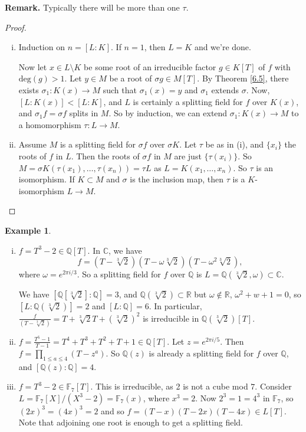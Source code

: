 \documentclass{article}
\theoremstyle{definition}
\newtheorem{example}{Example}[section]
\begin{document}
\textbf{Remark.} Typically there will be more than one $\tau$.

\begin{proof}
    \begin{enumerate}[(i)]
        \item Induction on $n = [L:K]$. If $n=1$, then $L=K$ and we're done.

        Now let $x \in L \setminus K$ be some root of an irreducible factor $g \in K[T]$ of $f$ with $\text{deg}(g)>1$. Let $y \in M$ be a root of $\sigma g \in M[T]$. By Theorem \ref{6.5}, there exists $\sigma_1 : K(x) \to M$ such that $\sigma_1(x) = y$ and $\sigma_1$ extends $\sigma.$ Now, $[L : K(x)] < [L : K]$, and $L$ is certainly a splitting field for $f$ over $K(x)$, and $\sigma_1 f =\sigma f$ splits in $M$. So by induction, we can extend $\sigma_1 : K(x) \to M$ to a homomorphism $\tau : L \to M$.
        \item Assume $M$ is a splitting field for $\sigma f$ over $\sigma K$. Let $\tau$ be as in (i), and $\{x_i\}$ the roots of $f$ in $L$. Then the roots of $\sigma f$ in $M$ are just $\{\tau(x_i)\}$. So $M = \sigma K (\tau(x_1),\ldots,\tau(x_n)) = \tau L$ as $L = K(x_1,\ldots,x_n)$. So $\tau$ is an isomorphism. If $K \subset M$ and $\sigma$ is the inclusion map, then $\tau$ is a $K$-isomorphism $L \to M$.
    \end{enumerate}
\end{proof}
\begin{example}
    \begin{enumerate}[(i)]
        \item $f = T^3-2 \in \mathbb{Q}[T]$. In $\mathbb{C}$, we have $$f=(T-\sqrt[3]{2})(T-\omega \sqrt[3]{2})(T-\omega^2\sqrt[3]{2}),$$ where $\omega = e^{2 \pi i /3}$. So a splitting field for $f$ over $\mathbb{Q}$ is $L=\mathbb{Q}(\sqrt[3]{2}, \omega) \subset \mathbb{C}$.

        We have $[\mathbb{Q}[\sqrt[3]{2}] : \mathbb{Q}] = 3$, and $\mathbb{Q}(\sqrt[3]{2}) \subset \mathbb{R}$ but $\omega \not\in \mathbb{R}$, $\omega^2+w+1=0$, so $[L : \mathbb{Q}(\sqrt[3]{2})] = 2$ and $[L:\mathbb{Q}]=6$. In particular, $\frac{f}{(T-\sqrt[3]{2})}=T+\sqrt[3]{2}T+(\sqrt[3]{2})^2$ is irreducible in $\mathbb{Q}(\sqrt[3]{2})[T].$
        \item $f = \frac{T^5-1}{T-1} = T^4 + T^3+T^2+T+1 \in \mathbb{Q}[T]$. Let $z = e^{2\pi i/5}$. Then $f = \prod_{1\le a\le 4}^{} (T-z^{a})$. So $\mathbb{Q}(z)$ is already a splitting field for $f$ over $\mathbb{Q}$, and $[\mathbb{Q}(z):\mathbb{Q}]=4$.
        \item $f = T^3-2 \in \mathbb{F}_7[T]$. This is irreducible, as 2 is not a cube mod $7$. Consider $L=\mathbb{F}_7[X]/(X^3-2) = \mathbb{F}_7(x)$, where $x^3=2$. Now $2^3=1=4^3$ in $\mathbb{F}_7$, so $(2x)^3=(4x)^3=2$ and so $f = (T-x)(T-2x)(T-4x) \in L[T]$. Note that adjoining one root is enough to get a splitting field.
    \end{enumerate}
\end{example}
\end{document}
